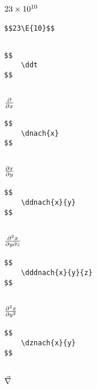 \documentclass[a4paper]{article}
\begin{document}
\subsection{$23 \times 10^{10}$}

\begin{verbatim}
$$23\E{10}$$
\end{verbatim}

\subsection{\ddt}

\begin{verbatim}
$$
	\ddt
$$
\end{verbatim}

\subsection{$ \frac{\partial}{\partial x}$}

\begin{verbatim}
$$
	\dnach{x}
$$
\end{verbatim}

\subsection{$ \frac{\partial x}{\partial y}$}

\begin{verbatim}
$$
	\ddnach{x}{y}
$$
\end{verbatim}


\subsection{$ \frac{\partial^2 x}{\partial y \partial z}$}

\begin{verbatim}
$$
	\dddnach{x}{y}{z}
$$
\end{verbatim}

\subsection{$ \frac{\partial^2 x}{\partial y^2}$}

\begin{verbatim}
$$
	\dznach{x}{y}
$$
\end{verbatim}

\subsection{$ \vec{\nabla}$}
\end{document}
